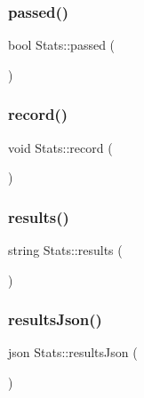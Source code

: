 \hypertarget{class_stats_aeadd76aff06c7e684370251d2e75abf3}{}\label{class_stats_aeadd76aff06c7e684370251d2e75abf3} 
\subsubsection{\texorpdfstring{passed()}{passed()}}
{\footnotesize\ttfamily bool Stats\+::passed (\begin{DoxyParamCaption}{ }\end{DoxyParamCaption})}

\hypertarget{class_stats_ad80ca89a4ce1578b41d0b64b873457af}{}\label{class_stats_ad80ca89a4ce1578b41d0b64b873457af} 
\subsubsection{\texorpdfstring{record()}{record()}}
{\footnotesize\ttfamily void Stats\+::record (\begin{DoxyParamCaption}\item[{std\+::shared\+\_\+ptr$<$ \hyperlink{class_rubric_item}{Rubric\+Item} $>$}]{ }\end{DoxyParamCaption})}

\hypertarget{class_stats_a0c05e0e2304a9ac271fc0e95493c9aeb}{}\label{class_stats_a0c05e0e2304a9ac271fc0e95493c9aeb} 
\subsubsection{\texorpdfstring{results()}{results()}}
{\footnotesize\ttfamily string Stats\+::results (\begin{DoxyParamCaption}{ }\end{DoxyParamCaption})}

\hypertarget{class_stats_a6d0361dcb25186d1d168009a66cb675d}{}\label{class_stats_a6d0361dcb25186d1d168009a66cb675d} 
\subsubsection{\texorpdfstring{results\+Json()}{resultsJson()}}
{\footnotesize\ttfamily json Stats\+::results\+Json (\begin{DoxyParamCaption}{ }\end{DoxyParamCaption})}



